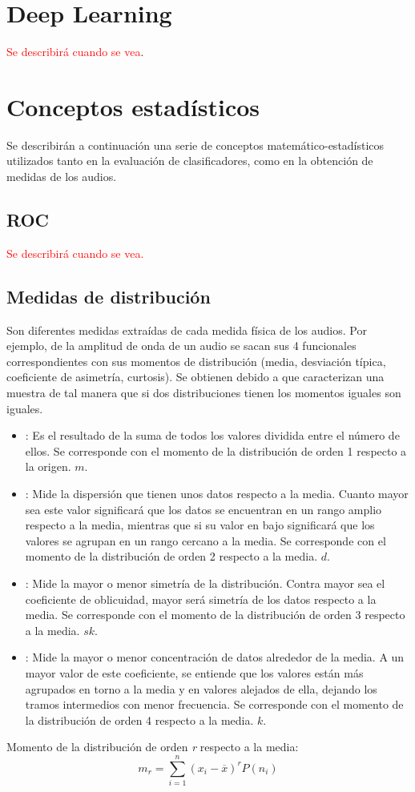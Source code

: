 \section{Deep Learning}
\textcolor{red}{Se describirá cuando se vea}.

\section{Conceptos estadísticos}
Se describirán a continuación una serie de conceptos matemático-estadísticos utilizados tanto en la evaluación de clasificadores, como en la obtención de medidas de los audios.
\subsection{ROC}
\textcolor{red}{Se describirá cuando se vea.}

\subsection{Medidas de distribución}
Son diferentes medidas extraídas de cada medida física de los audios. Por ejemplo, de la amplitud de onda de un audio se sacan sus 4 funcionales correspondientes con sus momentos de distribución (media, desviación típica, coeficiente de asimetría, curtosis). Se obtienen debido a que caracterizan una muestra de tal manera que si dos distribuciones tienen los momentos iguales son iguales.
\begin{itemize}
	\item {}: Es el resultado de la suma de todos los valores dividida entre el número de ellos. Se corresponde con el momento de la distribución de orden 1 respecto a la origen. $m$.
	\item {}: Mide la dispersión que tienen unos datos respecto a la media. Cuanto mayor sea este valor significará que los datos se encuentran en un rango amplio respecto a la media, mientras que si su valor en bajo significará que los valores se agrupan en un rango cercano a la media. Se corresponde con el momento de la distribución de orden 2 respecto a la media. $d$.
	\item {}: Mide la mayor o menor simetría de la distribución. Contra mayor sea el coeficiente de oblicuidad, mayor será simetría de los datos respecto a la media. Se corresponde con el momento de la distribución de orden 3 respecto a la media. $sk$. 
	\item {}: Mide la mayor o menor concentración de datos alrededor de la media. A un mayor valor de este coeficiente, se entiende que los valores están más agrupados en torno a la media y en valores alejados de ella, dejando los tramos intermedios con menor frecuencia. Se corresponde con el momento de la distribución de orden 4 respecto a la media. $k$.
\end{itemize}
Momento de la distribución de orden \textit{r} respecto a la media:\\
\begin{equation}
m_{r} = \sum_{i=1}^{n} (x_{i} - \overline{x})^{r} P(n_{i})
\end{equation}

